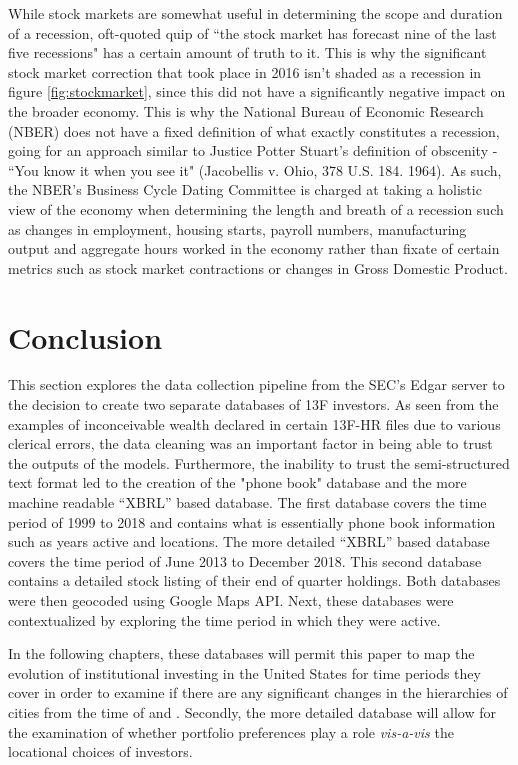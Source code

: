While stock markets are somewhat useful in determining the scope and duration of a recession, \cite{Samuelson1966} oft-quoted quip of ``the
stock market has forecast nine of the last five recessions" has a certain amount of truth to it. This is why the significant stock market correction that took place in 2016 isn't shaded as a recession in figure \ref{fig:stockmarket}, since this did not have a significantly negative impact on the broader economy. This is why the National Bureau of Economic Research (NBER) does not have a fixed definition of what exactly constitutes a recession, going for an approach similar to Justice Potter Stuart's definition of obscenity - ``You know it when you see it" (Jacobellis v. Ohio, 378 U.S. 184. 1964). As such, the NBER's Business Cycle Dating Committee is charged at taking a holistic view of the economy when determining the length and breath of a recession such as changes in employment, housing starts, payroll numbers, manufacturing output and aggregate hours worked in the economy rather than fixate of certain metrics such as stock market contractions or changes in Gross Domestic Product\citep{NBERBCDC2020}.  




\section{Conclusion}


This section explores the data collection pipeline from the SEC's Edgar server to the decision to create two separate databases of 13F investors. As seen from the examples of inconceivable wealth declared in certain 13F-HR files due to various clerical errors, the data cleaning was an important factor in being able to trust the outputs of the models.  Furthermore, the inability to trust the semi-structured text format led to the creation of the "phone book" database and the more machine readable ``XBRL'' based database.  The first database covers the time period of 1999 to 2018 and contains what is essentially phone book information such as years active and locations. The more detailed ``XBRL'' based database covers the time period of June 2013 to December 2018.  This second database contains a detailed stock listing of their end of quarter holdings.  Both databases were then geocoded using Google Maps API.  Next, these databases were contextualized by exploring the time period in which they were active.  

In the following chapters, these databases will permit this paper to map the evolution of institutional investing in the United States for time periods they cover in order to examine if there are any significant changes in the hierarchies of cities from the time of \cite{greena1993} and \cite{gravesthe1998}.  Secondly, the more detailed database will allow for the examination of whether portfolio preferences play a role \textit{vis-a-vis} the locational choices of investors.  


